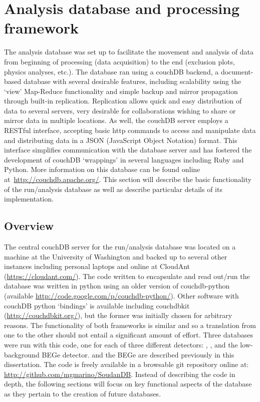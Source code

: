 	\section{Analysis database and processing framework}
	\label{sec:AnalysisDBProcFramework}
	\lstset{
	   language=JSON,
	   extendedchars=true,
	   basicstyle=\footnotesize\ttfamily,
	   showstringspaces=false,
	   showspaces=false,
	   numbers=left,
	   numberstyle=\footnotesize,
	   numbersep=9pt,
	   tabsize=2,
	   breaklines=true,
	   showtabs=false,
	   captionpos=b
	}	
	The analysis database was set up to facilitate the movement and analysis of data from beginning of processing (data acquisition) to the end (exclusion plots, physics analyses, etc.).  The database ran using a couchDB backend, a document-based database with several desirable features, including scalability using the `view' Map-Reduce functionality and simple backup and mirror propagation through built-in replication.  Replication allows quick and easy distribution of data to several servers, very desirable for collaborations wishing to share or mirror data in multiple locations.  As well, the couchDB server employs a RESTful interface, accepting basic http commands to access and manipulate data and distributing data in a JSON (JavaScript Object Notation) format.  This interface simplifies communication with the database server and has fostered the development of couchDB `wrappings' in several languages including Ruby and Python.  More information on this database can be found online at~\url{http://couchdb.apache.org/}.  This section will describe the basic functionality of the run/analysis database as well as describe particular details of its implementation.  
	
		\subsection{Overview}
		
	The central couchDB server for the run/analysis database was located on a machine at the University of Washington and backed up to several other instances including personal laptops and online at CloudAnt (\url{https://cloudant.com/}).  The code written to encapsulate and read out/run the database was written in python using an older version of couchdb-python (available \url{http://code.google.com/p/couchdb-python/}).  Other software with couchDB python `bindings' is available including couchdbkit (\url{http://couchdbkit.org/}), but the former was initially chosen for arbitrary reasons.  The functionality of both frameworks is similar and so a translation from one to the other should not entail a significant amount of effort.  Three databases were run with this code, one for each of three different detectors: , , and the low-background BEGe detector.   and the BEGe are described previously in this dissertation.  The code is freely available in a browsable git repository online at: \url{http://github.com/mgmarino/SoudanDB}.  Instead of describing the code in depth, the following sections will focus on key functional aspects of the database as they pertain to the creation of future databases.  
	
